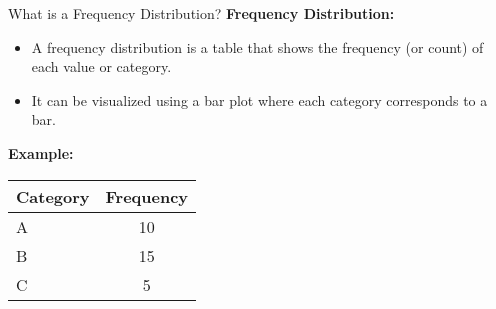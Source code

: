\documentclass[handout]{beamer} %
\begin{document}
\begin{frame}{What is a Frequency Distribution?}
    \textbf{Frequency Distribution:}
    \begin{itemize}
        \item A frequency distribution is a table that shows the frequency (or count) of each value or category.
        \item It can be visualized using a bar plot where each category corresponds to a bar.
    \end{itemize}

    \vspace{0.5cm}
    \textbf{Example:}
    \begin{center}
        \begin{tabular}{lc}
            \toprule
            \textbf{Category} & \textbf{Frequency} \\
            \midrule
            A & 10 \\
            B & 15 \\
            C & 5 \\
            \bottomrule
        \end{tabular}
    \end{center}

\end{frame}
\end{document}
